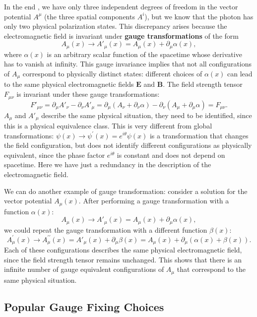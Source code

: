 In the end , we have only three independent degrees of freedom in the vector potential \(A^{\mu}\) (the three spatial components \(A^i\)), but we know that the photon has only two physical polarization states. This discrepancy arises because the electromagnetic field is invariant under \textbf{gauge transformations} of the form
\[
    A_\mu(x) \to A'_\mu(x) = A_\mu(x) + \partial_\mu \alpha(x),
\]
where \(\alpha(x)\) is an arbitrary scalar function of the spacetime whose derivative has to vanish at infinity. This gauge invariance implies that not all configurations of \(A_\mu\) correspond to physically distinct states: different choices of \(\alpha(x)\) can lead to the same physical electromagnetic fields \(\mathbf{E}\) and \(\mathbf{B}\). The field strength tensor \(F_{\mu\nu}\) is invariant under these gauge transformations:
\[
    F'_{\mu\nu} = \partial_\mu A'_\nu - \partial_\nu A'_\mu = \partial_\mu (A_\nu + \partial_\nu \alpha) - \partial_\nu (A_\mu + \partial_\mu \alpha) = F_{\mu\nu}.
\]
\(A_\mu\) and \(A'_\mu\) describe the same physical situation, they need to be identified, since this is a physical equivalence class. This is very different from global transformations: \(\psi(x) \to \psi^{\prime}(x) = e^{i\theta} \psi(x)\) is a transformation that changes the field configuration, but does not identify different configurations as physically equivalent, since the phase factor \(e^{i\theta}\) is constant and does not depend on spacetime. Here we have just a redundancy in the description of the electromagnetic field.

We can do another example of gauge transformation: consider a solution for the vector potential \(A_\mu(x)\). After performing a gauge transformation with a function \(\alpha(x)\):
\[
    A_\mu(x) \to A'_\mu(x) = A_\mu(x) + \partial_\mu \alpha(x),
\]
we could repeat the gauge transformation with a different function \(\beta(x)\):
\[
    A^{\prime}_\mu(x) \to A^{\prime\prime}_\mu(x) = A'_\mu(x) + \partial_\mu \beta(x) = A_\mu(x) + \partial_\mu (\alpha(x) + \beta(x)).
\]
Each of these configurations describes the same physical electromagnetic field, since the field strength tensor remains unchanged. This shows that there is an infinite number of gauge equivalent configurations of \(A_\mu\) that correspond to the same physical situation.

\subsection{Popular Gauge Fixing Choices}

